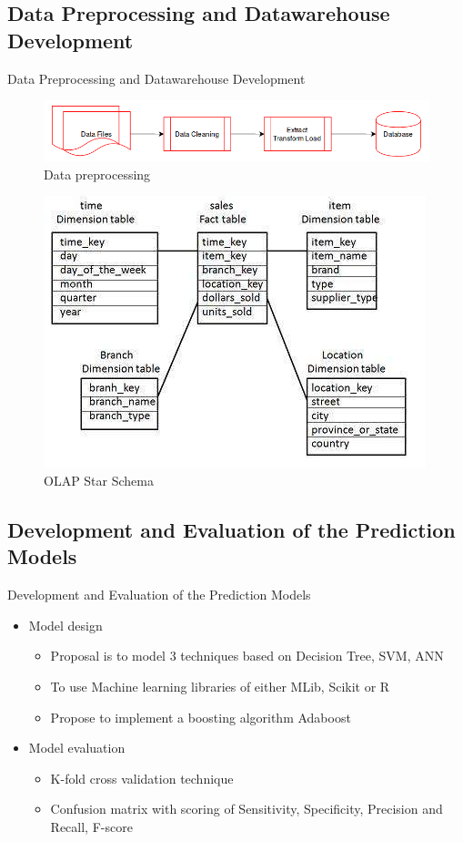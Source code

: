 \documentclass{beamer}
\begin{document}
\subsection{Data Preprocessing and Datawarehouse Development }
\begin{frame}{Data Preprocessing and Datawarehouse Development}
	\begin{figure}[h]
		\includegraphics[scale = 0.35]{ppt_figures/dataloadprocess.png}
		\centering
		\caption{Data preprocessing}
	\end{figure}
	 \begin{figure}
	 	\includegraphics[scale = 0.35]{ppt_figures/olap_start_schema.jpg}
	 	\centering
	 	\caption{OLAP Star Schema}
	 \end{figure}
\end{frame}

\subsection{Development and Evaluation of the Prediction Models}
\begin{frame}{Development and Evaluation of the Prediction Models}
	\begin{itemize}
		\item Model design
		\begin{itemize}
			\item Proposal is to model 3 techniques based on Decision Tree, SVM, ANN
			\item To use Machine learning libraries of either MLib, Scikit or R
			\item Propose to implement a boosting algorithm Adaboost			
		\end{itemize}
		\item Model evaluation
		\begin{itemize}
			\item K-fold cross validation technique
			\item Confusion matrix with scoring of Sensitivity, Specificity, Precision and Recall, F-score 
		\end{itemize}
	\end{itemize}
\end{frame}
\end{document}
